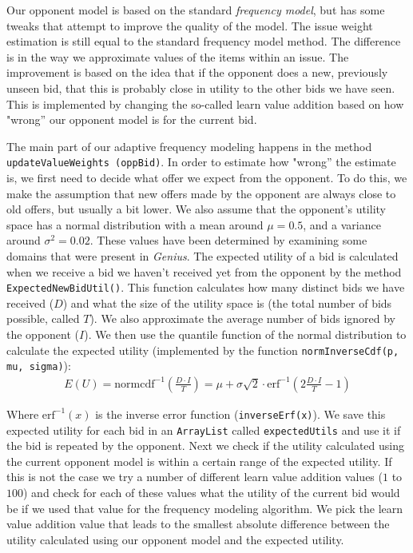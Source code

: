 Our opponent model is based on the standard \emph{frequency model}, but has some tweaks that attempt to improve the quality of the model. The issue weight estimation is still equal to the standard frequency model method. The difference is in the way we approximate values of the items within an issue. The improvement is based on the idea that if the opponent does a new, previously unseen bid, that this is probably close in utility to the other bids we have seen. This is implemented by changing the so-called learn value addition based on how "wrong'' our opponent model is for the current bid. 

The main part of our adaptive frequency modeling happens in the method \texttt{updateValueWeights (oppBid)}.
In order to estimate how "wrong'' the estimate is, we first need to decide what offer we expect from the opponent.
To do this, we make the assumption that new offers made by the opponent are always close to old offers, but usually a bit lower. 
We also assume that the opponent's utility space has a normal distribution with a mean around $\mu = 0.5$, and a variance around $\sigma^2 = 0.02$. 
These values have been determined by examining some domains that were present in \textit{Genius}. 
The expected utility of a bid is calculated when we receive a bid we haven't received yet from the opponent by the method \verb-ExpectedNewBidUtil()-. This function calculates how many distinct bids we have received ($D$) and what the size of the utility space is (the total number of bids possible, called $T$). We also approximate the average number of bids ignored by the opponent ($I$). We then use the quantile function of the normal distribution to calculate the expected utility (implemented by the function \verb-normInverseCdf(p, mu, sigma)-):
\begin{align}
  E(U) = \text{normcdf}^{-1} \left(\frac{D \cdot I}{T}\right) = \mu + \sigma \sqrt{2} \cdot \text{erf}^{-1} \left(2 \frac{D \cdot I}{T} - 1\right)
\end{align}

Where $\text{erf}^{-1}(x)$ is the inverse error function (\verb-inverseErf(x)-). 
We save this expected utility for each bid in an \verb-ArrayList- called \verb-expectedUtils- and use it if the bid is repeated by the opponent. 
Next we check if the utility calculated using the current opponent model is within a certain range of the expected utility. 
If this is not the case we try a number of different learn value addition values ($1$ to $100$) and check for each of these values what the utility of the current bid would be if we used that value for the frequency modeling algorithm. 
We pick the learn value addition value that leads to the smallest absolute difference between the utility calculated using our opponent model and the expected utility. 

